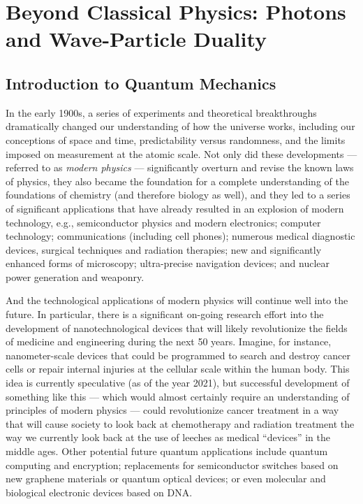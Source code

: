 \chapter[Beyond Classical Physics]{Beyond Classical Physics: Photons
and Wave-Particle Duality}
\label{chapter:beyond_classical}

\section{Introduction to Quantum Mechanics}


In the early 1900s, a series of experiments and theoretical breakthroughs
dramatically changed our understanding of how the universe works,
including our conceptions of space and time, predictability versus
randomness, and the limits imposed on measurement at the atomic scale.
Not only did these developments --- referred to as {\it modern physics}
--- significantly overturn and revise the known laws of physics, they also
became the foundation for a complete understanding of the foundations of
chemistry (and therefore biology as well), and they led to a series of
significant applications that have already resulted in  an explosion of
modern technology, e.g., semiconductor physics and modern electronics;
computer technology; communications (including cell phones); numerous
medical diagnostic devices, surgical techniques and radiation therapies;
new and significantly enhanced forms of microscopy; ultra-precise
navigation devices; and nuclear power generation and weaponry.

And the technological applications of modern physics will continue well
into the future. In particular, there is a significant on-going research
effort into the development of nanotechnological devices that will likely
revolutionize the fields of medicine and engineering during the next
50 years.  Imagine, for instance, nanometer-scale devices that could be
programmed to search and destroy cancer cells or repair internal injuries
at the cellular scale within the human body. This idea is currently
speculative (as of the year 2021), but successful development of something
like this --- which would almost certainly require an understanding of
principles of modern physics --- could revolutionize cancer treatment in
a way that will cause society to look back at chemotherapy and radiation
treatment the way we currently look back at the use of leeches as
medical ``devices'' in the middle ages. Other potential future quantum
applications include quantum computing and encryption; replacements for
semiconductor switches based on new graphene materials or quantum optical
devices; or even molecular and biological electronic devices based on DNA.

